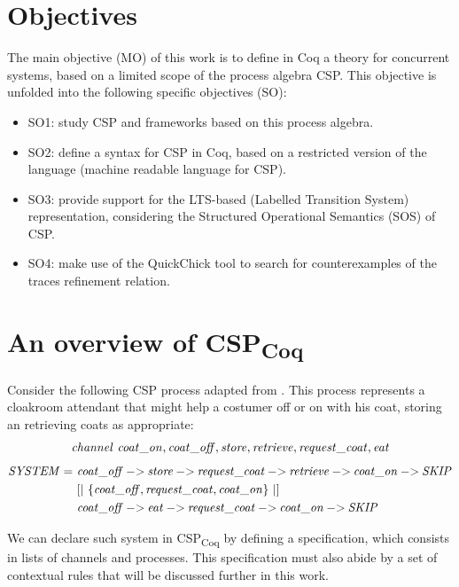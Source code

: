 \section{Objectives}

The main objective (MO) of this work is to define in Coq a theory for concurrent systems, based on a limited scope of the process algebra CSP. This objective is unfolded into the following specific objectives (SO):

\begin{itemize}  
	\item SO1: study CSP and frameworks based on this process algebra. 
	\item SO2: define a syntax for CSP in Coq, based on a restricted version of the \CSPM{} language (machine readable language for CSP). 
	\item SO3: provide support for the LTS-based (Labelled Transition System) representation, considering the Structured Operational Semantics (SOS) of CSP.
	\item SO4: make use of the QuickChick tool to search for counterexamples of the traces refinement relation.
\end{itemize}

\section{An overview of CSP\textsubscript{Coq}}


Consider the following CSP process adapted from . This process represents a cloakroom attendant that might help a costumer off or on with his coat, storing an retrieving coats as appropriate:
\begin{align}
	\mathit{channel\ coat\_on, coat\_off, store, retrieve, request\_coat, eat}\notag
\end{align}
\begin{align}
	\mathit{SYSTEM} =\ &\mathit{coat\_off \mathbin{{-}{>}} store \mathbin{{-}{>}} request\_coat \mathbin{{-}{>}} retrieve \mathbin{{-}{>}} coat\_on \mathbin{{-}{>}} SKIP}\notag\\
			 &[|\ \{\mathit{coat\_off, request\_coat, coat\_on}\}\ |]\notag\\
	  		 &\mathit{coat\_off \mathbin{{-}{>}} eat \mathbin{{-}{>}} request\_coat \mathbin{{-}{>}} coat\_on \mathbin{{-}{>}} SKIP}\notag
\end{align}

We can declare such system in CSP\textsubscript{Coq} by defining a specification, which consists in lists of channels and processes. This specification must also abide by a set of contextual rules that will be discussed further in this work.

